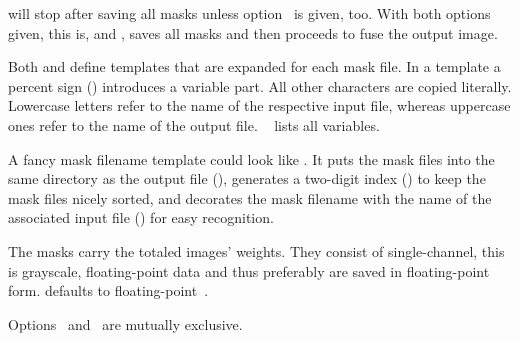\begin{codelist}
    \App{} will stop after saving all masks unless
    option~ is given, too.  With both options given,
    this is,  and , \App{} saves all masks and then
    proceeds to fuse the output image.

    Both  and 
    define templates that are expanded for each mask file.  In a template a percent sign
    (\sample{\%}) introduces a variable part.  All other characters are copied literally.
    Lowercase letters refer to the name of the respective input file, whereas uppercase ones
    refer to the name of the output file.  \tableName~
    lists all variables.

    A fancy mask filename template could look like .  It puts the
    mask files into the same directory as the output file (), generates a two-digit
    index () to keep the mask files nicely sorted, and decorates the mask filename
    with the name of the associated input file () for easy recognition.

    The masks carry the totaled images' weights.  They consist of single-channel, this is
    grayscale, floating-point data and thus preferably are saved in floating-point form.  \App{}
    defaults to floating-point~.

    Options~ and~ are mutually exclusive.
\fi
\end{codelist}


\ifenfuse
  
\fi



